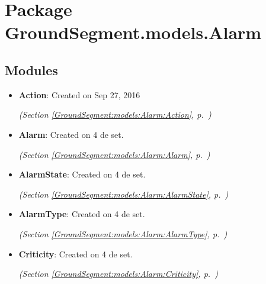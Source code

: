 %
%
%


\section{Package GroundSegment.models.Alarm}

    \label{GroundSegment:models:Alarm}


\subsection{Modules}

\begin{itemize}
\setlength{\parskip}{0ex}
\item \textbf{Action}: 
Created on Sep 27, 2016




  \textit{(Section \ref{GroundSegment:models:Alarm:Action}, p.~\pageref{GroundSegment:models:Alarm:Action})}

\item \textbf{Alarm}: 
Created on 4 de set. 


  \textit{(Section \ref{GroundSegment:models:Alarm:Alarm}, p.~\pageref{GroundSegment:models:Alarm:Alarm})}

\item \textbf{AlarmState}: 
Created on 4 de set. 


  \textit{(Section \ref{GroundSegment:models:Alarm:AlarmState}, p.~\pageref{GroundSegment:models:Alarm:AlarmState})}

\item \textbf{AlarmType}: 
Created on 4 de set. 


  \textit{(Section \ref{GroundSegment:models:Alarm:AlarmType}, p.~\pageref{GroundSegment:models:Alarm:AlarmType})}

\item \textbf{Criticity}: 
Created on 4 de set. 


  \textit{(Section \ref{GroundSegment:models:Alarm:Criticity}, p.~\pageref{GroundSegment:models:Alarm:Criticity})}

\end{itemize}

